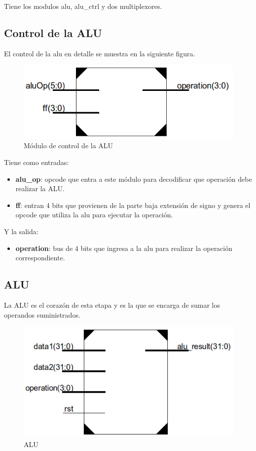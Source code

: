 Tiene los modulos alu, alu\_ctrl y dos multiplexores.

\subsection{Control de la ALU}
El control de la alu en detalle se muestra en la siguiente figura.

\begin{figure}[H]
\centering
\includegraphics[scale=0.5]{img/alu_ctrl}
\caption{M\'odulo de control de la ALU}
\label{fig:fetch}
\end{figure}

Tiene como entradas:

\begin{itemize}
  \item \textbf{alu\_op}: opcode que entra a este m\'odulo para decodificar que operaci\'on debe realizar la ALU.
  \item \textbf{ff}: entran 4 bits que provienen de la parte baja extensi\'on de signo y genera el opcode que utiliza la alu para ejecutar la operaci\'on.  
\end{itemize}

Y la salida:
\begin{itemize}
  \item \textbf{operation}: bus de 4 bits que ingresa a la alu para realizar la operaci\'on correspondiente.
\end{itemize}

\subsection{ALU} 
La ALU es el coraz\'on de esta etapa y es la que se encarga de sumar los operandos suministrados.

\begin{figure}[H]
\centering
\includegraphics[scale=0.5]{img/alu}
\caption{ALU}
\label{fig:fetch}
\end{figure}


